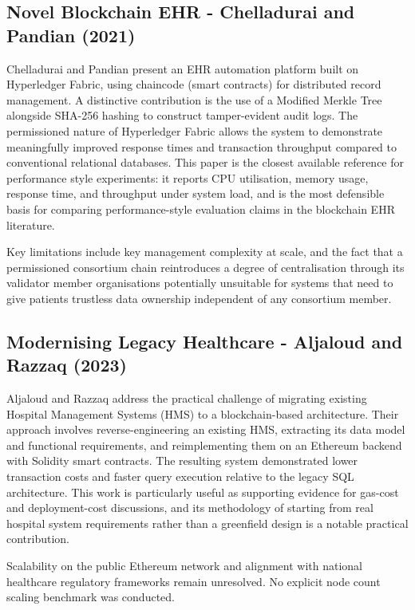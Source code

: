 \documentclass[12pt,a4wide]{report}
\begin{document}
\subsection{Novel Blockchain EHR - Chelladurai and Pandian (2021)}

Chelladurai and Pandian present an EHR automation platform built on Hyperledger
Fabric, using chaincode (smart contracts) for distributed record management.
A distinctive contribution is the use of a Modified Merkle Tree alongside SHA-256
hashing to construct tamper-evident audit logs. The permissioned nature of Hyperledger
Fabric allows the system to demonstrate meaningfully improved response times and
transaction throughput compared to conventional relational databases. This paper
is the closest available reference for performance style experiments: it reports
CPU utilisation, memory usage, response time, and throughput under system load,
and is the most defensible basis for comparing performance-style evaluation claims
in the blockchain EHR literature.

Key limitations include key management complexity at scale, and the fact that a
permissioned consortium chain reintroduces a degree of centralisation through its
validator member organisations potentially unsuitable for systems that need to
give patients trustless data ownership independent of any consortium member.

\subsection{Modernising Legacy Healthcare - Aljaloud and Razzaq (2023)}

Aljaloud and Razzaq address the practical challenge of migrating existing Hospital
Management Systems (HMS) to a blockchain-based architecture. Their approach involves
reverse-engineering an existing HMS, extracting its data model and functional
requirements, and reimplementing them on an Ethereum backend with Solidity smart
contracts. The resulting system demonstrated lower transaction costs and faster
query execution relative to the legacy SQL architecture. This work is particularly
useful as supporting evidence for gas-cost and deployment-cost discussions, and
its methodology of starting from real hospital system requirements rather than a
greenfield design is a notable practical contribution.

Scalability on the public Ethereum network and alignment with national healthcare
regulatory frameworks remain unresolved. No explicit node count scaling benchmark
was conducted.
\end{document}
